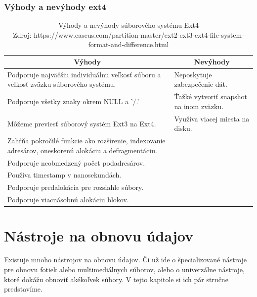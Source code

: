 \documentclass[12pt,oneside,slovak,a4paper]{article}
\begin{document}
\subsubsection{Výhody a nevýhody ext4}


\begin{table}[H]
\begin{tabularx}{\textwidth}{|X|X|}
\hline
\multicolumn{1}{|c|}{\textbf{Výhody}} & \multicolumn{1}{c|}{\textbf{Nevýhody}} \\ \hline
Podporuje najväčšiu individuálnu veľkosť súboru a veľkosť zväzku súborového systému. & Neposkytuje zabezpečenie dát. \\ \hline
Podporuje všetky znaky okrem NULL a '/.' & Ťažké vytvoriť snapshot na inom zväzku. \\ \hline
Môžeme previesť súborový systém Ext3 na Ext4. & Využíva viacej miesta na disku. \\ \hline
Zahŕňa pokročilé funkcie ako rozšírenie, indexovanie adresárov, oneskorenú alokáciu a defragmentáciu. &  \\ \hline
Podporuje neobmedzený počet podadresárov. &  \\ \hline
Používa timestamp v nanosekundách. &  \\ \hline
Podporuje predalokácia pre rozsiahle súbory. &  \\ \hline
Podporuje viacnásobnú alokáciu blokov. &  \\ \hline
\end{tabularx}
\centering
\captionsetup{justification=centering,margin=2cm}
\caption{Výhody a nevýhody súborového systému Ext4 \\ Zdroj: https://www.easeus.com/partition-master/ext2-ext3-ext4-file-system-format-and-difference.html}
\end{table}

\pagebreak %


\section{Nástroje na obnovu údajov}
Existuje mnoho nástrojov na obnovu údajov. Či už ide o špecializované nástroje pre obnovu fotiek alebo multimediálnych súborov, alebo o univerzálne nástroje, ktoré dokážu obnoviť akékoľvek súbory. V tejto kapitole si ich pár stručne predstavíme.
\end{document}
